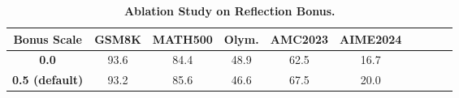 \begin{table}[h]
  \begin{center}
  \footnotesize
  \captionsetup{font=small}
  \caption{\textbf{Ablation Study on Reflection Bonus.}}
  \setlength{\tabcolsep}{1.3pt}
  \begin{tabular}{cccccccccc}
    \toprule
    \textbf{Bonus Scale} &\textbf{GSM8K} & \textbf{MATH500}  &  \textbf{Olym.} & \textbf{AMC2023} & \textbf{AIME2024} \\
    \midrule
    \textbf{0.0} & 93.6 & 84.4  & 48.9 & 62.5 & 16.7 \\
    \textbf{0.5 (default)} &93.2 & 85.6 &46.6 & 67.5 &20.0   \\
    \bottomrule
  \end{tabular}
  \label{table:reflect-bonus}
  \end{center}
\end{table}